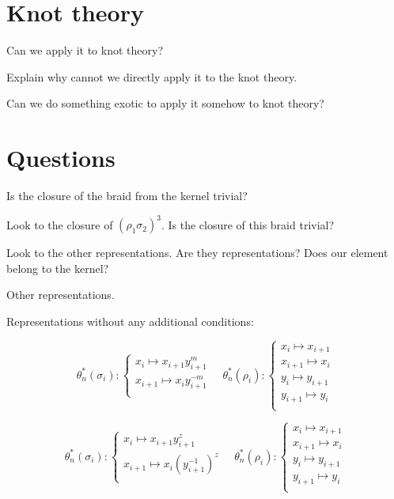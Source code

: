 \documentclass{article}
\begin{document}
\section{Knot theory}
Can we apply it to knot theory?

Explain why cannot we directly apply it to the knot theory.

Can we do something exotic to apply it somehow to knot theory?

\section{Questions}
Is the closure of the braid from the kernel trivial?

Look to the closure of $(\rho_1\sigma_2)^3$. Is the closure of this braid trivial?

Look to the other representations. Are they representations? Does our element belong to the kernel?

Other representations.

Representations without any additional conditions:

\begin{equation}\label{defGV}
\theta_n^*(\sigma_i):
\begin{cases}
x_i \mapsto x_{i+1}y_{i+1}^m\\
x_{i+1} \mapsto x_iy_{i+1}^{-m}\\
\end{cases}\quad
\theta_n^*(\rho_i):
\begin{cases}
x_i \mapsto x_{i+1}\\
x_{i+1} \mapsto x_i\\
y_i \mapsto y_{i+1}\\
y_{i+1} \mapsto y_i\\
\end{cases}
\end{equation}

\begin{equation}\label{defGV}
\theta_n^*(\sigma_i):
\begin{cases}
x_i \mapsto x_{i+1}y_{i+1}^z\\
x_{i+1} \mapsto x_i(y_{i+1}^{-1})^z\\
\end{cases}\quad
\theta_n^*(\rho_i):
\begin{cases}
x_i \mapsto x_{i+1}\\
x_{i+1} \mapsto x_i\\
y_i \mapsto y_{i+1}\\
y_{i+1} \mapsto y_i\\
\end{cases}
\end{equation}
\end{document}
